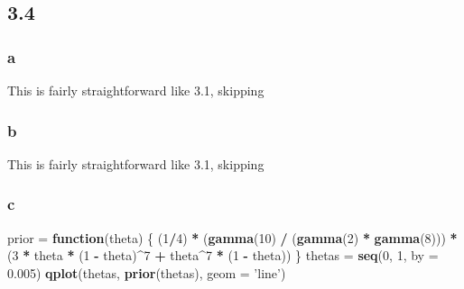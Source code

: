 \documentclass[]{article}
\newenvironment{Shaded}{\begin{snugshade}}{\end{snugshade}}
\newcommand{\ControlFlowTok}[1]{\textcolor[rgb]{0.13,0.29,0.53}{\textbf{#1}}}
\newcommand{\DataTypeTok}[1]{\textcolor[rgb]{0.13,0.29,0.53}{#1}}
\newcommand{\DecValTok}[1]{\textcolor[rgb]{0.00,0.00,0.81}{#1}}
\newcommand{\FloatTok}[1]{\textcolor[rgb]{0.00,0.00,0.81}{#1}}
\newcommand{\KeywordTok}[1]{\textcolor[rgb]{0.13,0.29,0.53}{\textbf{#1}}}
\newcommand{\NormalTok}[1]{#1}
\newcommand{\OperatorTok}[1]{\textcolor[rgb]{0.81,0.36,0.00}{\textbf{#1}}}
\newcommand{\StringTok}[1]{\textcolor[rgb]{0.31,0.60,0.02}{#1}}
\begin{document}
\hypertarget{section-3}{%
\subsection{3.4}\label{section-3}}

\hypertarget{a-2}{%
\subsubsection{a}\label{a-2}}

This is fairly straightforward like 3.1, skipping

\hypertarget{b-2}{%
\subsubsection{b}\label{b-2}}

This is fairly straightforward like 3.1, skipping

\hypertarget{c-2}{%
\subsubsection{c}\label{c-2}}

\begin{Shaded}
\begin{Highlighting}[]
\NormalTok{prior =}\StringTok{ }\ControlFlowTok{function}\NormalTok{(theta) \{}
\NormalTok{  (}\DecValTok{1}\OperatorTok{/}\DecValTok{4}\NormalTok{) }\OperatorTok{*}\StringTok{ }\NormalTok{(}\KeywordTok{gamma}\NormalTok{(}\DecValTok{10}\NormalTok{) }\OperatorTok{/}\StringTok{ }\NormalTok{(}\KeywordTok{gamma}\NormalTok{(}\DecValTok{2}\NormalTok{) }\OperatorTok{*}\StringTok{ }\KeywordTok{gamma}\NormalTok{(}\DecValTok{8}\NormalTok{))) }\OperatorTok{*}\StringTok{ }
\StringTok{    }\NormalTok{(}\DecValTok{3} \OperatorTok{*}\StringTok{ }\NormalTok{theta }\OperatorTok{*}\StringTok{ }\NormalTok{(}\DecValTok{1} \OperatorTok{-}\StringTok{ }\NormalTok{theta)}\OperatorTok{^}\DecValTok{7} \OperatorTok{+}\StringTok{ }\NormalTok{theta}\OperatorTok{^}\DecValTok{7} \OperatorTok{*}\StringTok{ }\NormalTok{(}\DecValTok{1} \OperatorTok{-}\StringTok{ }\NormalTok{theta))}
\NormalTok{\}}
\NormalTok{thetas =}\StringTok{ }\KeywordTok{seq}\NormalTok{(}\DecValTok{0}\NormalTok{, }\DecValTok{1}\NormalTok{, }\DataTypeTok{by =} \FloatTok{0.005}\NormalTok{)}
\KeywordTok{qplot}\NormalTok{(thetas, }\KeywordTok{prior}\NormalTok{(thetas), }\DataTypeTok{geom =} \StringTok{'line'}\NormalTok{)}
\end{Highlighting}
\end{Shaded}
\end{document}
